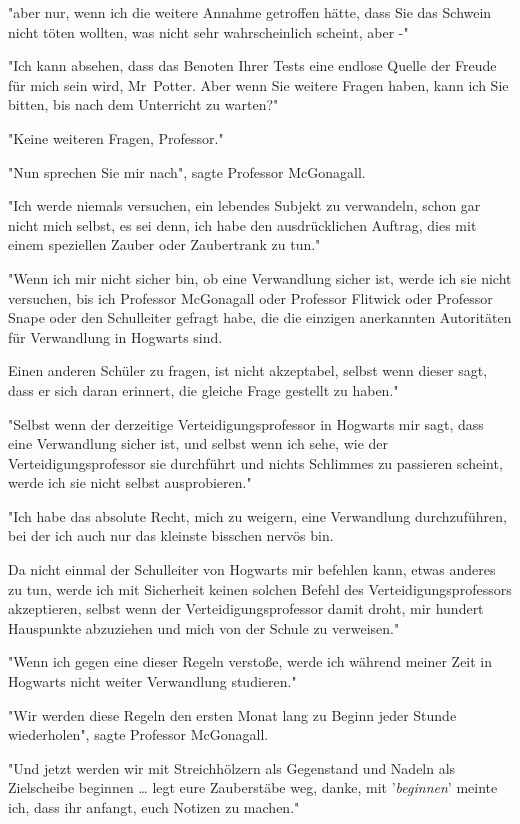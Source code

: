 {"aber nur, wenn ich die weitere Annahme getroffen hätte, dass Sie das Schwein nicht töten wollten, was nicht sehr wahrscheinlich scheint, aber -"

"Ich kann absehen, dass das Benoten Ihrer Tests eine endlose Quelle der Freude für mich sein wird, Mr~Potter. Aber wenn Sie weitere Fragen haben, kann ich Sie bitten, bis nach dem Unterricht zu warten?"

"Keine weiteren Fragen, Professor."

"Nun sprechen Sie mir nach", sagte Professor McGonagall.

"Ich werde niemals versuchen, ein lebendes Subjekt zu verwandeln, schon gar nicht mich selbst, es sei denn, ich habe den ausdrücklichen Auftrag, dies mit einem speziellen Zauber oder Zaubertrank zu tun."

"Wenn ich mir nicht sicher bin, ob eine Verwandlung sicher ist, werde ich sie nicht versuchen, bis ich Professor McGonagall oder Professor Flitwick oder Professor Snape oder den Schulleiter gefragt habe, die die einzigen anerkannten Autoritäten für Verwandlung in Hogwarts sind.

Einen anderen Schüler zu fragen, ist nicht akzeptabel, selbst wenn dieser sagt, dass er sich daran erinnert, die gleiche Frage gestellt zu haben."

"Selbst wenn der derzeitige Verteidigungsprofessor in Hogwarts mir sagt, dass eine Verwandlung sicher ist, und selbst wenn ich sehe, wie der Verteidigungsprofessor sie durchführt und nichts Schlimmes zu passieren scheint, werde ich sie nicht selbst ausprobieren."

"Ich habe das absolute Recht, mich zu weigern, eine Verwandlung durchzuführen, bei der ich auch nur das kleinste bisschen nervös bin.

Da nicht einmal der Schulleiter von Hogwarts mir befehlen kann, etwas anderes zu tun, werde ich mit Sicherheit keinen solchen Befehl des Verteidigungsprofessors akzeptieren, selbst wenn der Verteidigungsprofessor damit droht, mir hundert Hauspunkte abzuziehen und mich von der Schule zu verweisen."

"Wenn ich gegen eine dieser Regeln verstoße, werde ich während meiner Zeit in Hogwarts nicht weiter Verwandlung studieren."

"Wir werden diese Regeln den ersten Monat lang zu Beginn jeder Stunde wiederholen", sagte Professor McGonagall.

"Und jetzt werden wir mit Streichhölzern als Gegenstand und Nadeln als Zielscheibe beginnen … legt eure Zauberstäbe weg, danke, mit '\emph{beginnen}' meinte ich, dass ihr anfangt, euch Notizen zu machen."

}
